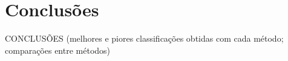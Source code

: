 \documentclass{beamer}
\begin{document}
	\section[Conclusões]{Conclusões}

\begin{frame}

CONCLUSÕES (melhores e piores classificações obtidas com cada método; comparações entre métodos)

\end{frame}
	
	
\end{document}
